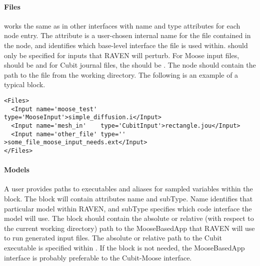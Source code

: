 \paragraph{Files}
 works the same as in other interfaces with name and type
attributes for each node entry.  The  attribute is a user-chosen internal
name for the file contained in the node, and  identifies which base-level
interface the file is used within.   should only be specified for inputs
that RAVEN will perturb.  For Moose input files,  should be  and for
Cubit journal files, the  should be .  The node should contain the
path to the file from the working directory.  The following is an example
of a typical  block.

\begin{lstlisting}[style=XML]
<Files>
  <Input name='moose_test' type='MooseInput'>simple_diffusion.i</Input>
  <Input name='mesh_in'    type='CubitInput'>rectangle.jou</Input>
  <Input name='other_file' type=''          >some_file_moose_input_needs.ext</Input>
</Files>
\end{lstlisting}

\paragraph{Models}
A user provides paths to executables and aliases for sampled variables within the
 block.  The  block will contain attributes name and
subType.  Name identifies that particular  model within RAVEN, and
subType specifies which code interface the model will use. The 
block should contain the absolute or relative (with respect to the current working
directory) path to the MooseBasedApp that RAVEN will use to run generated input
files.  The absolute or relative path to the Cubit executable is specified within
.  If the  block is not needed, the
MooseBasedApp interface is probably preferable to the Cubit-Moose interface.

